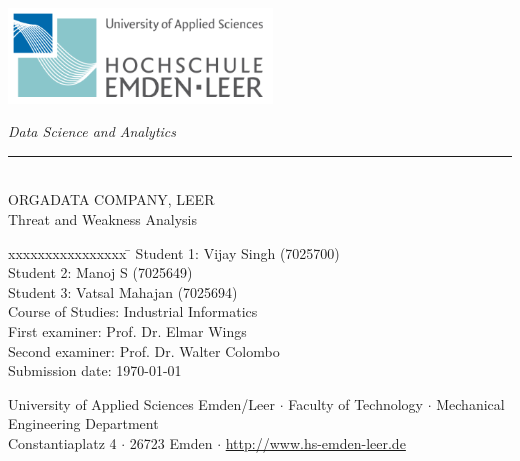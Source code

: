 %
%

\begin{titlepage}
    
    \begin{flushleft} 
        \includegraphics[width=7cm]{General/Logo.png}
    \end{flushleft} 
    
    \begin{flushright}
        \vspace{2cm}
        \LARGE \textsl{Data Science and Analytics}\\
        \rule{0.6\textwidth}{0.4pt} ~\\
        \vspace{0.5cm}
        \textsf{\LARGE ORGADATA COMPANY, LEER}\\
        \textsf{\LARGE Threat and Weakness Analysis}
    \end{flushright}
    
    \vspace{2cm}
    \large
    \begin{tabbing}
        xxxxxxxxxxxxxxxx \= \kill
        Student 1: \> Vijay Singh (7025700)\\
        Student 2: \> Manoj S (7025649) \\
        Student 3: \> Vatsal Mahajan (7025694)\\
        Course of Studies: \> Industrial Informatics \\ [0.5cm]
        First examiner: \> Prof. Dr. Elmar Wings \\
        Second examiner: \> Prof. Dr. Walter Colombo \\ [0.5cm]
        Submission date: \> \today \\
    \end{tabbing}
    
    \vspace{3cm}
    \small
    \begin{center}
        University of Applied Sciences Emden/Leer $\cdot$ 
        Faculty of Technology $\cdot$ 
        Mechanical Engineering Department \\
        Constantiaplatz 4 $\cdot$ 
        26723 Emden $\cdot$ 
        \url{http://www.hs-emden-leer.de}
    \end{center}
    
\end{titlepage}
